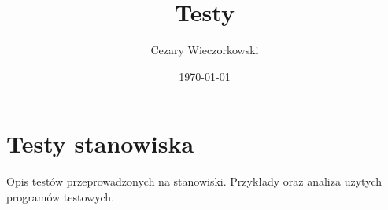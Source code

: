\documentclass[../main.tex]{subfiles}
\author{Cezary Wieczorkowski}
\date{\today}
\title{Testy}
\begin{document}
\section{Testy stanowiska}

Opis testów przeprowadzonych na stanowiski. Przykłady oraz analiza użytych programów testowych.
\end{document}

